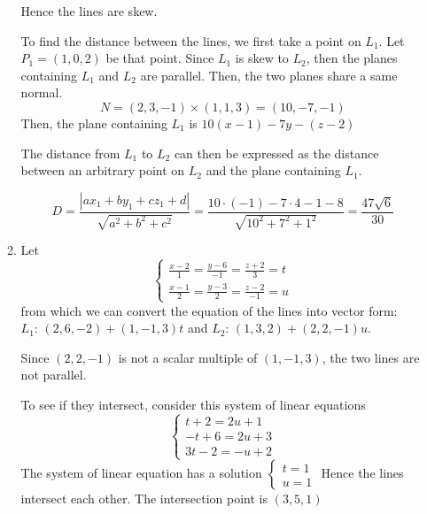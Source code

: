 \documentclass[11pt]{article}
\begin{document}
\begin{enumerate}
\begin{enumerate}
        Hence the lines are skew.
        
        To find the distance between the lines, we first take a point on $L_1$. Let $P_1=(1,0,2)$ be that point. Since $L_1$ is skew to $L_2$, then the planes containing $L_1$ and $L_2$ are parallel. Then, the two planes share a same normal.
        $$
        N=(2,3,-1) \times (1,1,3) = (10,-7,-1)
        $$
        Then, the plane containing $L_1$ is $10(x-1)-7y-(z-2)$
        
        The distance from $L_1$ to $L_2$ can then be expressed as the distance between an arbitrary point on $L_2$ and the plane containing $L_1$.
        
        $$
        D = \frac{|ax_1+by_1+cz_1+d|}{\sqrt{a^2+b^2+c^2}} = \frac{10\cdot (-1) -7 \cdot 4 - 1 - 8}{\sqrt{10^2+7^2+1^2}} = \frac{47\sqrt{6}}{30}
        $$
        
        \item
        Let
        $$
        \begin{cases}
        \frac{x-2}{1}=\frac{y-6}{-1}=\frac{z+2}{3} = t \\
        \frac{x-1}{2}=\frac{y-3}{2}=\frac{z-2}{-1} = u
        \end{cases}
        $$
        from which we can convert the equation of the lines into vector form: $L_1:\, (2,6,-2)+(1,-1,3)t$ and $L_2:\, (1,3,2)+(2,2,-1)u$.
        
        Since $(2,2,-1)$ is not a scalar multiple of $(1,-1,3)$, the two lines are not parallel.
        
        To see if they intersect, consider this system of linear equations
        $$
        \begin{cases}
        t+2=2u+1 \\
        -t+6=2u+3 \\
        3t-2=-u+2
        \end{cases}
        $$
        The system of linear equation has a solution
        $
        \begin{cases}
        t = 1\\
        u = 1
        \end{cases}
        $
        Hence the lines intersect each other. The intersection point is $(3,5,1)$
    \end{enumerate}
\end{enumerate}
\end{document}
